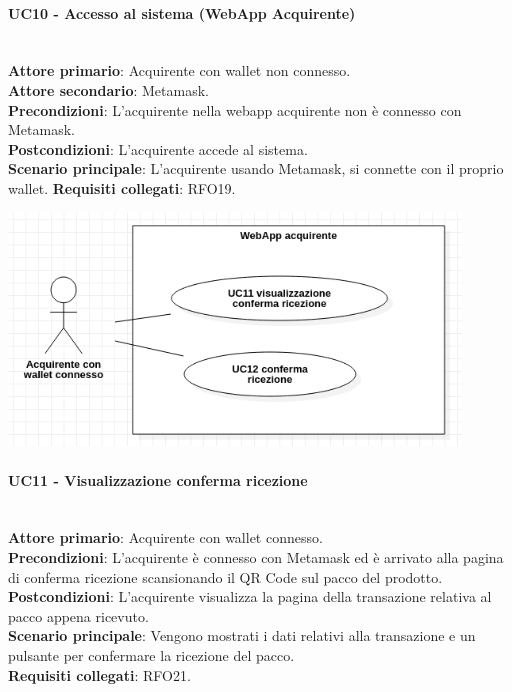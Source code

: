 \documentclass[a4paper, 12pt]{article}
\begin{document}
\paragraph{UC10 - Accesso al sistema (WebApp Acquirente)}\\
\textbf{Attore primario}: Acquirente con wallet non connesso.\\
\textbf{Attore secondario}: Metamask.\\
\textbf{Precondizioni}: L'acquirente nella webapp acquirente non è connesso con Metamask.\\
\textbf{Postcondizioni}: L'acquirente accede al sistema.\\
\textbf{Scenario principale}:
L'acquirente usando Metamask, si connette con il proprio wallet.
\textbf{Requisiti collegati}: RFO19.

\includegraphics[width=0.9\textwidth]{UC_WAA2}

\paragraph{UC11 - Visualizzazione conferma ricezione}\\
\textbf{Attore primario}: Acquirente con wallet connesso.\\
\textbf{Precondizioni}: L'acquirente è connesso con Metamask ed è arrivato alla pagina di conferma ricezione scansionando il QR Code sul pacco del prodotto.\\
\textbf{Postcondizioni}: L'acquirente visualizza la pagina della transazione relativa al pacco appena ricevuto.\\
\textbf{Scenario principale}:
Vengono mostrati i dati relativi alla transazione e un pulsante per confermare la ricezione del pacco.\\
\textbf{Requisiti collegati}: RFO21.
\end{document}
